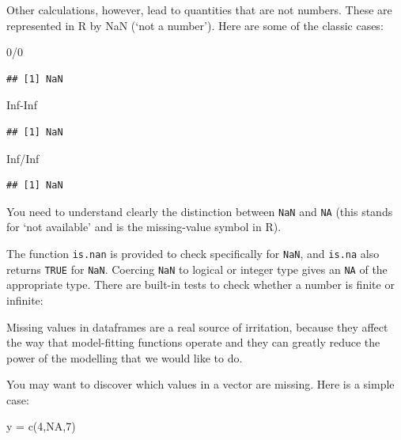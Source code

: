 \documentclass[
]{book}
\newenvironment{Shaded}{\begin{snugshade}}{\end{snugshade}}
\newcommand{\ConstantTok}[1]{\textcolor[rgb]{0.00,0.00,0.00}{#1}}
\newcommand{\DecValTok}[1]{\textcolor[rgb]{0.00,0.00,0.81}{#1}}
\newcommand{\FunctionTok}[1]{\textcolor[rgb]{0.00,0.00,0.00}{#1}}
\newcommand{\NormalTok}[1]{#1}
\newcommand{\OtherTok}[1]{\textcolor[rgb]{0.56,0.35,0.01}{#1}}
\newcommand{\SpecialCharTok}[1]{\textcolor[rgb]{0.00,0.00,0.00}{#1}}
\theoremstyle{definition}
\theoremstyle{definition}
\theoremstyle{definition}
\theoremstyle{definition}
\theoremstyle{remark}
\begin{document}
Other calculations, however, lead to quantities that are not numbers. These are represented in R by NaN (`not a number'). Here are some of the classic cases:

\begin{Shaded}
\begin{Highlighting}[]
\DecValTok{0}\SpecialCharTok{/}\DecValTok{0}
\end{Highlighting}
\end{Shaded}

\begin{verbatim}
## [1] NaN
\end{verbatim}

\begin{Shaded}
\begin{Highlighting}[]
\ConstantTok{Inf}\SpecialCharTok{{-}}\ConstantTok{Inf}
\end{Highlighting}
\end{Shaded}

\begin{verbatim}
## [1] NaN
\end{verbatim}

\begin{Shaded}
\begin{Highlighting}[]
\ConstantTok{Inf}\SpecialCharTok{/}\ConstantTok{Inf}
\end{Highlighting}
\end{Shaded}

\begin{verbatim}
## [1] NaN
\end{verbatim}

You need to understand clearly the distinction between \texttt{NaN} and \texttt{NA} (this stands for `not available' and is the missing-value symbol in R).

The function \texttt{is.nan} is provided to check specifically for \texttt{NaN}, and \texttt{is.na} also returns \texttt{TRUE} for \texttt{NaN}. Coercing \texttt{NaN} to logical or integer type gives an \texttt{NA} of the appropriate type. There are built-in tests to check whether a number is finite or infinite:

Missing values in dataframes are a real source of irritation, because they affect the way that model-fitting functions operate and they can greatly reduce the power of the modelling that we would like to do.

You may want to discover which values in a vector are missing. Here is a simple case:

\begin{Shaded}
\begin{Highlighting}[]
\NormalTok{y }\OtherTok{=} \FunctionTok{c}\NormalTok{(}\DecValTok{4}\NormalTok{,}\ConstantTok{NA}\NormalTok{,}\DecValTok{7}\NormalTok{)}
\end{Highlighting}
\end{Shaded}
\end{document}
